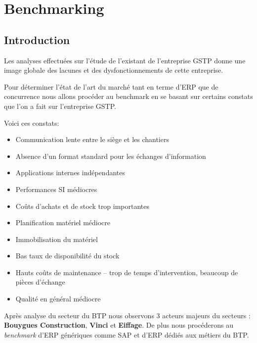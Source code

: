 \vfil
\pagebreak
\section{Benchmarking}

\subsection{Introduction}

Les analyses effectuées sur l'étude de l'existant
de l'entreprise GSTP donne une
image globale des lacunes et des dysfonctionnements
de cette entreprise.

Pour déterminer l'état de l'art du marché tant en
terme d'ERP que de concurrence
nous allons procéder au benchmark en se basant sur
certains constats que l'on
a fait sur l'entreprise GSTP.

Voici ces constats:
\begin{itemize}
\item Communication lente entre le siège et les chantiers
\item Absence d'un format standard pour les échanges d'information
\item Applications internes indépendantes
\item Performances SI médiocres
\item Coûts d'achats et de stock trop importantes
\item Planification matériel médiocre
\item Immobilisation du matériel
\item Bas taux de disponibilité du stock
\item Hauts coûts de maintenance – trop de temps d'intervention,
beaucoup de pièces d'échange
\item Qualité en général médiocre
\end{itemize}

Après analyse du secteur du BTP nous observons 3 acteurs majeurs du secteurs :
{\bf Bouygues Construction}, {\bf Vinci} et {\bf Eiffage}. De plus nous procéderons 
au {\sl benchmark} d'ERP génériques comme SAP et d'ERP dédiés aux métiers du BTP.
\vfil
\pagebreak
